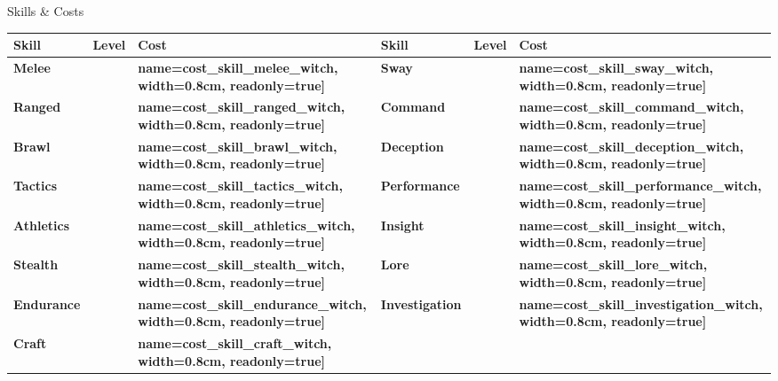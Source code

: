 \documentclass[10pt]{article}
\newcommand{\skilldots}[1]{%
  \TextField[
    name=#1,
    bordercolor={0 0 0},
    backgroundcolor={255 255 255},
    readonly=false,
    width=1.5cm,
    height=0.45cm,
    maxlen=1,
    chars=2,
    align=0,
    default=0
  ]{}%
  \hspace{-0.2em}%
  \raisebox{0.4ex}{%
    \small%
    \textcolor{gray}{%
      \(\bigcirc\)\(\bigcirc\)\(\bigcirc\)\(\bigcirc\)\(\bigcirc\)%
    }%
  }%
}
\newcommand{\tf}[1]{\TextField[#1]{}}
\begin{document}
\begin{Form}
\begin{minipage}[t]{0.48\linewidth}
    \begin{charbox}{Skills \& Costs}
        \begin{tabular}{>{\bfseries}p{2.5cm} >{\bfseries}p{1.5cm} >{\bfseries}p{1.5cm} >{\bfseries}p{2.5cm} >{\bfseries}p{1.5cm} >{\bfseries}p{1.5cm}}
            \toprule
            \textbf{Skill} & \textbf{Level} & \textbf{Cost} & \textbf{Skill} & \textbf{Level} & \textbf{Cost} \\
            \midrule
            Melee & \skilldots{skill_melee_witch} & \tf[name=cost_skill_melee_witch, width=0.8cm, readonly=true]{} & 
            Sway & \skilldots{skill_sway_witch} & \tf[name=cost_skill_sway_witch, width=0.8cm, readonly=true]{} \\
            Ranged & \skilldots{skill_ranged_witch} & \tf[name=cost_skill_ranged_witch, width=0.8cm, readonly=true]{} & 
            Command & \skilldots{skill_command_witch} & \tf[name=cost_skill_command_witch, width=0.8cm, readonly=true]{} \\
            Brawl & \skilldots{skill_brawl_witch} & \tf[name=cost_skill_brawl_witch, width=0.8cm, readonly=true]{} & 
            Deception & \skilldots{skill_deception_witch} & \tf[name=cost_skill_deception_witch, width=0.8cm, readonly=true]{} \\
            Tactics & \skilldots{skill_tactics_witch} & \tf[name=cost_skill_tactics_witch, width=0.8cm, readonly=true]{} & 
            Performance & \skilldots{skill_performance_witch} & \tf[name=cost_skill_performance_witch, width=0.8cm, readonly=true]{} \\
            Athletics & \skilldots{skill_athletics_witch} & \tf[name=cost_skill_athletics_witch, width=0.8cm, readonly=true]{} & 
            Insight & \skilldots{skill_insight_witch} & \tf[name=cost_skill_insight_witch, width=0.8cm, readonly=true]{} \\
            Stealth & \skilldots{skill_stealth_witch} & \tf[name=cost_skill_stealth_witch, width=0.8cm, readonly=true]{} & 
            Lore & \skilldots{skill_lore_witch} & \tf[name=cost_skill_lore_witch, width=0.8cm, readonly=true]{} \\
            Endurance & \skilldots{skill_endurance_witch} & \tf[name=cost_skill_endurance_witch, width=0.8cm, readonly=true]{} & 
            Investigation & \skilldots{skill_investigation_witch} & \tf[name=cost_skill_investigation_witch, width=0.8cm, readonly=true]{} \\
            Craft & \skilldots{skill_craft_witch} & \tf[name=cost_skill_craft_witch, width=0.8cm, readonly=true]{} & 

\end{tabular}
\end{charbox}
\end{minipage}
\end{Form}
\end{document}

